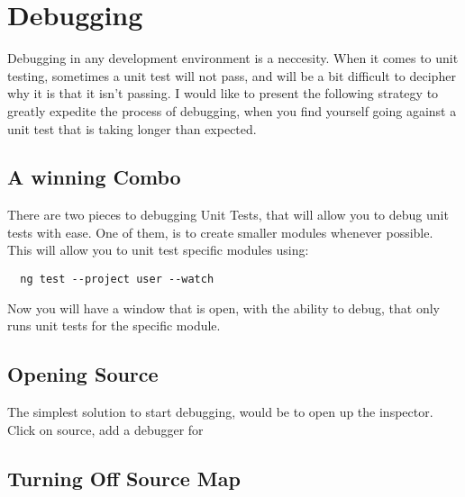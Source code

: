 \maketitle{}
\section{ Debugging }

Debugging in any development environment is a neccesity. When it comes to unit
testing, sometimes a unit test will not pass, and will be a bit difficult to
decipher why it is that it isn't passing. I would like to present the following
strategy to greatly expedite the process of debugging, when you find yourself
going against a unit test that is taking longer than expected.

\subsection{ A winning Combo }
There are two pieces to debugging Unit Tests, that will allow you to debug unit
tests with ease. One of them, is to create smaller modules whenever possible.
This will allow you to unit test specific modules using:
\begin{verbatim}
  ng test --project user --watch
\end{verbatim}

Now you will have a window that is open, with the ability to debug, that only
runs unit tests for the specific module.

\subsection{ Opening Source }
The simplest solution to start debugging, would be to open up the inspector.
Click on source, add a debugger for

\subsection{ Turning Off Source Map }
